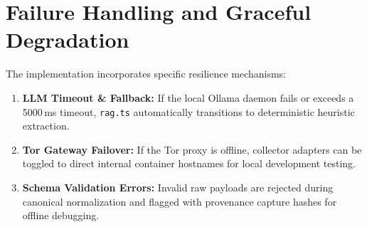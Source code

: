 \section{Failure Handling and Graceful Degradation}
\label{sec:impl-failure-handling}
The implementation incorporates specific resilience mechanisms:
\begin{enumerate}
    \item \textbf{LLM Timeout \& Fallback:} If the local Ollama daemon fails or exceeds a 5000\,ms timeout, \texttt{rag.ts} automatically transitions to deterministic heuristic extraction.
    \item \textbf{Tor Gateway Failover:} If the Tor proxy is offline, collector adapters can be toggled to direct internal container hostnames for local development testing.
    \item \textbf{Schema Validation Errors:} Invalid raw payloads are rejected during canonical normalization and flagged with provenance capture hashes for offline debugging.
\end{enumerate}
